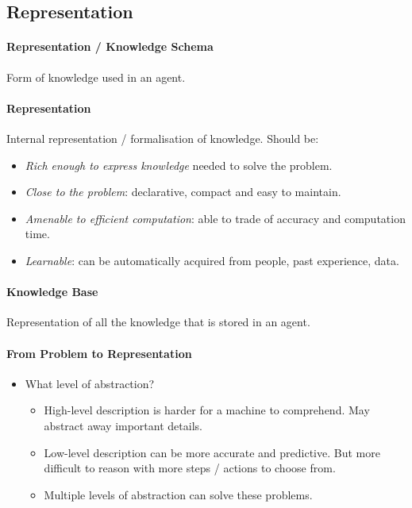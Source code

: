 \documentclass[twocolumn,english]{article}
\begin{document}
\subsection{Representation}

\paragraph{Representation / Knowledge Schema}

Form of knowledge used in an agent.

\paragraph{Representation}

Internal representation / formalisation of knowledge. Should be:
\begin{itemize}
\item \emph{Rich enough to express knowledge} needed to solve the problem.
\item \emph{Close to the problem}: declarative, compact and easy to maintain.
\item \emph{Amenable to efficient computation}: able to trade of accuracy
and computation time.
\item \emph{Learnable}: can be automatically acquired from people, past
experience, data.
\end{itemize}

\paragraph{Knowledge Base}

Representation of all the knowledge that is stored in an agent.

\paragraph{From Problem to Representation}
\begin{itemize}
\item What level of abstraction?
\begin{itemize}
\item High-level description is harder for a machine to comprehend. May
abstract away important details.
\item Low-level description can be more accurate and predictive. But more
difficult to reason with \textemdash{} more steps / actions to choose
from.
\item Multiple levels of abstraction can solve these problems.
\end{itemize}
\end{itemize}
\end{document}

